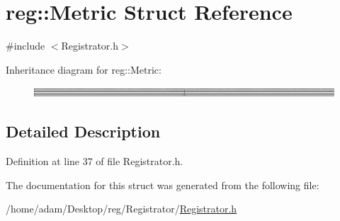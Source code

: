 \hypertarget{structreg_1_1_metric}{}\section{reg\+:\+:Metric Struct Reference}
\label{structreg_1_1_metric}


{\ttfamily \#include $<$Registrator.\+h$>$}

Inheritance diagram for reg\+:\+:Metric\+:\begin{figure}[H]
\begin{center}
\leavevmode
\includegraphics[height=0.352645cm]{structreg_1_1_metric}
\end{center}
\end{figure}


\subsection{Detailed Description}


Definition at line 37 of file Registrator.\+h.



The documentation for this struct was generated from the following file\+:\begin{DoxyCompactItemize}
\item 
/home/adam/\+Desktop/reg/\+Registrator/\hyperlink{_registrator_8h}{Registrator.\+h}\end{DoxyCompactItemize}
